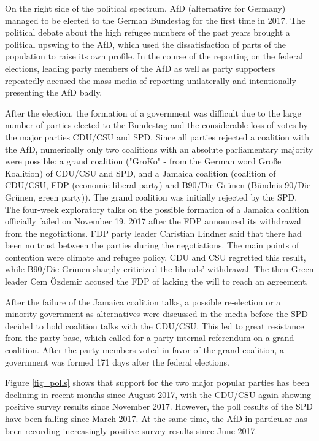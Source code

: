 \documentclass[12pt,a4paper,notitlepage]{article}
\begin{document}
On the right side of the political spectrum, AfD (alternative for Germany) managed to be elected to the German Bundestag for the first time in 2017. The political debate about the high refugee numbers of the past years brought a political upswing to the AfD, which used the dissatisfaction of parts of the population to raise its own profile. In the course of the reporting on the federal elections, leading party members of the AfD as well as party supporters repeatedly accused the mass media of reporting unilaterally and intentionally presenting the AfD badly.

After the election, the formation of a government was difficult due to the large number of parties elected to the Bundestag and the considerable loss of votes by the major parties CDU/CSU and SPD. Since all parties rejected a coalition with the AfD, numerically only two coalitions with an absolute parliamentary majority were possible: a grand coalition ("GroKo" - from the German word Große Koalition) of CDU/CSU and SPD, and a Jamaica coalition (coalition of CDU/CSU, FDP (economic liberal party) and B90/Die Grünen (Bündnis 90/Die Grünen, green party)). The grand coalition was initially rejected by the SPD. The four-week exploratory talks on the possible formation of a Jamaica coalition officially failed on November 19, 2017 after the FDP announced its withdrawal from the negotiations. FDP party leader Christian Lindner said that there had been no trust between the parties during the negotiations. The main points of contention were climate and refugee policy. CDU and CSU regretted this result, while B90/Die Grünen sharply criticized the liberals' withdrawal. The then Green leader Cem Özdemir accused the FDP of lacking the will to reach an agreement.

After the failure of the Jamaica coalition talks, a possible re-election or a minority government as alternatives were discussed in the media before the SPD decided to hold coalition talks with the CDU/CSU. This led to great resistance from the party base, which called for a party-internal referendum on a grand coalition. After the party members voted in favor of the grand coalition, a government was formed 171 days after the federal elections. 

Figure \ref{fig_polls} shows that support for the two major popular parties has been declining in recent months since August 2017, with the CDU/CSU again showing positive survey results since November 2017. However, the poll results of the SPD have been falling since March 2017. At the same time, the AfD in particular has been recording increasingly positive survey results since June 2017.  
\end{document}
